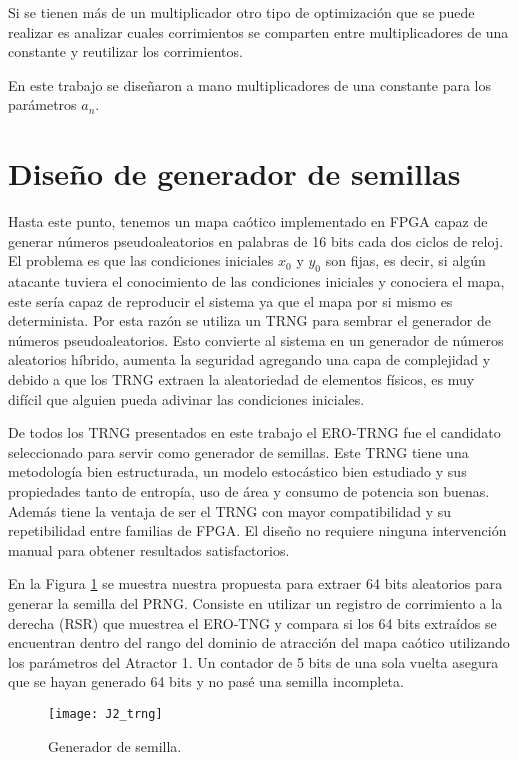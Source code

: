     Si se tienen más de un multiplicador otro tipo de optimización que se puede realizar es analizar cuales corrimientos se comparten entre multiplicadores de una constante y reutilizar los corrimientos.

    En este trabajo se diseñaron a mano multiplicadores de una constante para los parámetros $a_{n}$.

    \section{Diseño de generador de semillas}

        Hasta este punto, tenemos un mapa caótico implementado en FPGA capaz de generar números pseudoaleatorios en palabras de 16 bits cada dos ciclos de reloj. El problema es que las condiciones iniciales $x_{0}$ y $y_{0}$ son fijas, es decir, si algún atacante tuviera el conocimiento de las condiciones iniciales y conociera el mapa, este sería capaz de reproducir el sistema ya que el mapa por si mismo es determinista. Por esta razón se utiliza un TRNG para sembrar el generador de números pseudoaleatorios. Esto convierte al sistema en un generador de números aleatorios híbrido, aumenta la seguridad agregando una capa de complejidad y debido a que los TRNG extraen la aleatoriedad de elementos físicos, es muy difícil que alguien pueda adivinar las condiciones iniciales. 

        De todos los TRNG presentados en este trabajo el ERO-TRNG fue el candidato seleccionado para servir como generador de semillas. Este TRNG tiene una metodología bien estructurada, un modelo estocástico bien estudiado y sus propiedades tanto de entropía, uso de área y consumo de potencia son buenas. Además tiene la ventaja de ser el TRNG con mayor compatibilidad y su repetibilidad entre familias de FPGA. El diseño no requiere ninguna intervención manual para obtener resultados satisfactorios. 

        En la Figura \ref{fig:J2_trng} se muestra nuestra propuesta para extraer 64 bits aleatorios para generar la semilla del PRNG. Consiste en utilizar un registro de corrimiento a la derecha (RSR) que muestrea el ERO-TNG y compara si los 64 bits extraídos se encuentran dentro del rango del dominio de atracción del mapa caótico utilizando los parámetros del Atractor 1. Un contador de 5 bits de una sola vuelta asegura que se hayan generado 64 bits y no pasé una semilla incompleta.

        \begin{figure}[hbtp]
            \centering
            \texttt{[image: J2\_trng]}
            \caption{Generador de semilla.}
            \label{fig:J2_trng}
        \end{figure}

